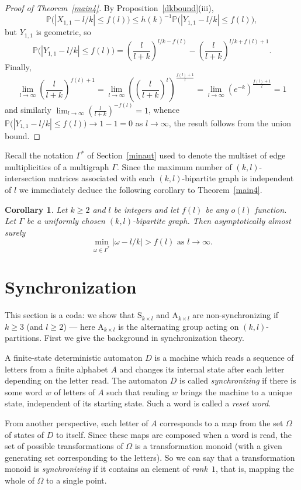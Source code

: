 \documentclass{daj}
\newcommand\A{\mathrm{A}}
\renewcommand\S{\mathrm{S}}
\theoremstyle{plain}
\newtheorem{corollary}[theorem]{Corollary}
\theoremstyle{definition}
\begin{document}
\begin{proof}[Proof of Theorem~\ref{main4}]
By Proposition~\ref{dkbound}(iii), $$\mathbb{P}\big(|X_{1,1}-l/k|\leq f(l)\big)\leq h(k)^{-1}\mathbb{P}\big(|Y_{1,1}-l/k|\leq f(l)\big),$$
but $Y_{1,1}$ is geometric, so $$\mathbb{P}\big(|Y_{1,1}-l/k|\leq f(l)\big)=\left(\frac{l}{l+k}\right)^{l/k-f(l)}-\left(\frac{l}{l+k}\right)^{l/k+f(l)+1}.$$ Finally, $$\lim_{l\to\infty}\left(\frac{l}{l+k}\right)^{f(l)+1}=\lim_{l\to\infty}\left(\left(\frac{l}{l+k}\right)^{l}\right)^{\frac{f(l)+1}{l}}=\lim_{l\to\infty}(e^{-k})^{\frac{f(l)+1}{l}}=1$$
and similarly $\lim_{l\to\infty}\left(\frac{l}{l+k}\right)^{-f(l)}=1$, whence $\mathbb{P}\big(|Y_{1,1}-l/k|\leq f(l)\big)\to 1-1=0$ as $l\to \infty$, the result follows from the union bound.
\end{proof}
Recall the notation $\Gamma^*$ of Section~\ref{minaut} used to denote the multiset of edge multiplicities of a multigraph $\Gamma$. Since the maximum number of $(k,l)$-intersection matrices associated with each $(k,l)$-bipartite graph is independent of $l$ we immediately deduce the following corollary to Theorem~\ref{main4}.
\begin{corollary}\label{edges}
Let $k\geq 2$ and $l$ be integers and let $f(l)$ be any $o(l)$ function. Let $\Gamma$ be a uniformly chosen $(k,l)$-bipartite graph. Then asymptotically almost surely $$\min_{\omega\in\Gamma^*}|\omega-l/k|>f(l)\text{ as $l\to\infty$.}$$
\end{corollary}

\section{Synchronization}\label{sync}

This section is a coda: we show that $\S_{k\times l}$ and $\A_{k\times l}$ are non-synchronizing if
$k\geq3$ (and $l\ge2$) --- here $\A_{k\times l}$ is the alternating group acting on $(k,l)$-partitions. First we give the background in synchronization theory.

A finite-state deterministic automaton $D$ is a machine which reads a sequence of
letters from a finite alphabet $A$ and changes its internal state after each
letter depending on the letter read. The automaton $D$ is called
\emph{synchronizing} if there is some word $w$ of letters of $A$ such that reading $w$ brings the machine to a unique state, independent of its starting
state. Such a word is called a \emph{reset word}.

From another perspective, each letter of $A$ corresponds to a map
from the set $\Omega$ of states of $D$ to itself. Since these maps are composed when
a word is read, the set of possible transformations of $\Omega$ is a
transformation monoid (with a given generating set corresponding to the
letters). So we can say that a transformation monoid is \emph{synchronizing} if
it contains an element of \emph{rank}~$1$, that is, mapping the whole of 
$\Omega$ to a single point.
\end{document}
